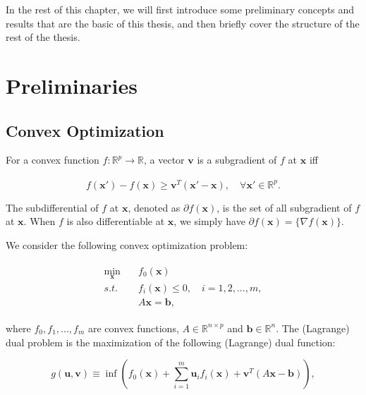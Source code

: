 In the rest of this chapter, we will first introduce some preliminary concepts and results that are the basic of this thesis, and then briefly cover the structure of the rest of the thesis.

\section{Preliminaries}

\subsection{Convex Optimization}

For a convex function $f:\mathbb{R}^p\xrightarrow[]{}\mathbb{R}$, a vector $\boldsymbol v$ is a subgradient of $f$ at $\boldsymbol x$ iff

\begin{equation}
    f(\boldsymbol x')-f(\boldsymbol x)\geq \boldsymbol v^T(\boldsymbol x'-\boldsymbol x),\quad\forall \boldsymbol x'\in \mathbb{R}^p.
\end{equation}

The subdifferential of $f$ at $\boldsymbol x$, denoted as $\partial f(\boldsymbol x)$, is the set of all subgradient of $f$ at $\boldsymbol x$. When $f$ is also differentiable at $\boldsymbol x$, we simply have $\partial f(\boldsymbol x)=\{\nabla f(\boldsymbol x)\}$. 

We consider the following convex optimization problem:

\begin{gather}
    \begin{aligned}
        \label{eq:primeintro}
        \underset{\boldsymbol x}{\min}\quad &f_0(\boldsymbol x)\\
        \textit{s.t.}\quad &f_i(\boldsymbol x)\leq 0,\quad i=1,2,...,m,\\
        & A\boldsymbol x=\boldsymbol b,
    \end{aligned}
\end{gather}

where $f_0,f_1,...,f_m$ are convex functions, $A\in\mathbb{R}^{n\times p}$ and $\boldsymbol b\in\mathbb{R}^n$. The (Lagrange) dual problem is the maximization of the following (Lagrange) dual function:

\begin{equation}
    \label{eq:dualintro}
    g(\boldsymbol u,\boldsymbol v)\equiv \inf\left(f_0(\boldsymbol x)+\sum_{i=1}^m\boldsymbol u_if_i(\boldsymbol x)+\boldsymbol v^T(A\boldsymbol x-\boldsymbol b)\right),
\end{equation}

